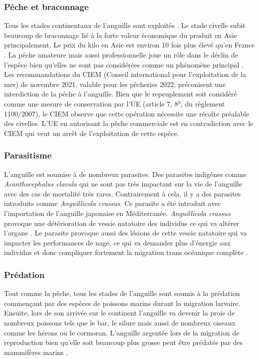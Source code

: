 \documentclass[11pt,titlepage,twoside]{article}\usepackage[]{graphicx}\usepackage[table]{xcolor}
\begin{document}
\subsubsection{Pêche et braconnage }

Tous les stades continentaux de l’anguille sont exploités \citep{dekker_worldwide_2003}. Le stade civelle subit beaucoup de braconnage lié à la forte valeur économique du produit en Asie principalement. Le prix du kilo en Asie est environ 10 fois plus élevé qu’en France \citep{adam_anguille_2008}. La pêche amateure mais aussi professionnelle joue un rôle dans le déclin de l’espèce bien qu’elles ne sont pas considérées comme un phénomène principal \citep{prouzet_etude_2003}. 
Les recommandations du CIEM (Conseil international pour l’exploitation de la mer) de novembre 2021, valable pour les pêcheries 2022, préconisent une interdiction de la pêche à l’anguille. Bien que le repeuplement soit considéré comme une mesure de conservation par l’UE (article 7, 8°, du règlement 1100/2007), le CIEM observe que cette opération nécessite une récolte préalable des civelles. L’UE en autorisant la pêche commerciale est en contradiction avec le CIEM qui veut un arrêt de l’exploitation de cette espèce. 

\subsubsection{Parasitisme}

L’anguille est soumise à de nombreux parasites. Des parasites indigènes comme \textit{Acanthocephalus clavula} qui ne sont pas très impactant sur la vie de l’anguille avec des cas de mortalité très rares. Contrairement à cela, il y a des parasites introduits comme \textit{Anguillicola crassus}. Ce parasite a été introduit avec l’importation de l’anguille japonaise en Méditerranée. \textit{Anguillicola crassus} provoque une détérioration de vessie natatoire des individus ce qui va altérer l’organe \citep{kirk_effect_2000}. Le parasite provoque aussi des lésions de cette vessie natatoire qui va impacter les performances de nage, ce qui va demander plus d’énergie aux individus et donc compliquer fortement la migration trans océanique complète \citep{kirk_impact_2003}. 

 
\subsubsection{Prédation}

Tout comme la pêche, tous les stades de l’anguille sont soumis à la prédation commençant par des espèces de poissons marins durant la migration larvaire. Ensuite, lors de son arrivée sur le continent l’anguille va devenir la proie de nombreux poissons tels que le bar, le silure mais aussi de nombreux oiseaux comme les hérons ou le cormoran. L’anguille argentée lors de la migration de reproduction bien qu’elle soit beaucoup plus grosse peut être prédatés par des mammifères marins \citep{brusle_anguille_1994, carpentier_effects_2009}.
\end{document}
